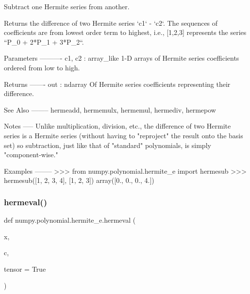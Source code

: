 \begin{DoxyVerb}Subtract one Hermite series from another.

Returns the difference of two Hermite series `c1` - `c2`.  The
sequences of coefficients are from lowest order term to highest, i.e.,
[1,2,3] represents the series ``P_0 + 2*P_1 + 3*P_2``.

Parameters
----------
c1, c2 : array_like
    1-D arrays of Hermite series coefficients ordered from low to
    high.

Returns
-------
out : ndarray
    Of Hermite series coefficients representing their difference.

See Also
--------
hermeadd, hermemulx, hermemul, hermediv, hermepow

Notes
-----
Unlike multiplication, division, etc., the difference of two Hermite
series is a Hermite series (without having to "reproject" the result
onto the basis set) so subtraction, just like that of "standard"
polynomials, is simply "component-wise."

Examples
--------
>>> from numpy.polynomial.hermite_e import hermesub
>>> hermesub([1, 2, 3, 4], [1, 2, 3])
array([0., 0., 0., 4.])\end{DoxyVerb}
 \mbox{\label{namespacenumpy_1_1polynomial_1_1hermite__e_a57c60860d471eb7e395d59e1f07a7bc0}} 
\subsubsection{\texorpdfstring{hermeval()}{hermeval()}}
{\footnotesize\ttfamily def numpy.\+polynomial.\+hermite\+\_\+e.\+hermeval (\begin{DoxyParamCaption}\item[{}]{x,  }\item[{}]{c,  }\item[{}]{tensor = {\ttfamily True} }\end{DoxyParamCaption})}


